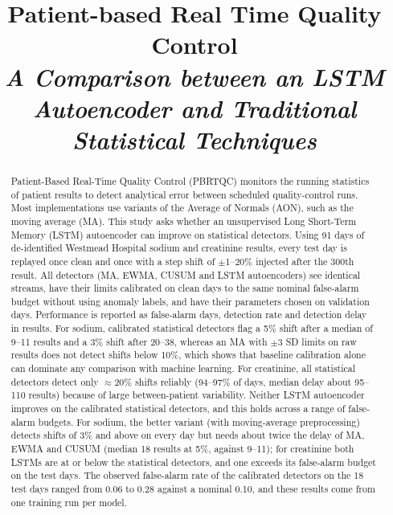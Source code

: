\documentclass[conference]{IEEEtran}
\begin{document}
\title{Patient-based Real Time Quality Control\\
\textit{A Comparison between an LSTM Autoencoder and Traditional Statistical Techniques}}

\author{
}

\maketitle

\begin{abstract}
Patient-Based Real-Time Quality Control (PBRTQC) monitors the running statistics of patient results to detect analytical error between scheduled quality-control runs. Most implementations use variants of the Average of Normals (AON), such as the moving average (MA). This study asks whether an unsupervised Long Short-Term Memory (LSTM) autoencoder can improve on statistical detectors. Using 91 days of de-identified Westmead Hospital sodium and creatinine results, every test day is replayed once clean and once with a step shift of $\pm$1--20\% injected after the 300th result. All detectors (MA, EWMA, CUSUM and LSTM autoencoders) see identical streams, have their limits calibrated on clean days to the same nominal false-alarm budget without using anomaly labels, and have their parameters chosen on validation days. Performance is reported as false-alarm days, detection rate and detection delay in results. For sodium, calibrated statistical detectors flag a 5\% shift after a median of 9--11 results and a 3\% shift after 20--38, whereas an MA with $\pm3$ SD limits on raw results does not detect shifts below 10\%, which shows that baseline calibration alone can dominate any comparison with machine learning. For creatinine, all statistical detectors detect only $\approx$20\% shifts reliably (94--97\% of days, median delay about 95--110 results) because of large between-patient variability. Neither LSTM autoencoder improves on the calibrated statistical detectors, and this holds across a range of false-alarm budgets. For sodium, the better variant (with moving-average preprocessing) detects shifts of 3\% and above on every day but needs about twice the delay of MA, EWMA and CUSUM (median 18 results at 5\%, against 9--11); for creatinine both LSTMs are at or below the statistical detectors, and one exceeds its false-alarm budget on the test days. The observed false-alarm rate of the calibrated detectors on the 18 test days ranged from 0.06 to 0.28 against a nominal 0.10, and these results come from one training run per model.
\end{abstract}
\end{document}
